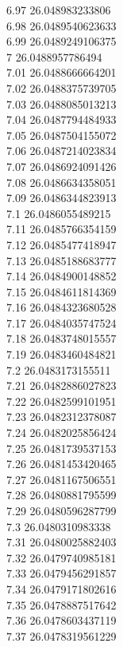 {6.97	26.048983233806\\
6.98	26.0489540623633\\
6.99	26.0489249106375\\
7	26.0488957786494\\
7.01	26.0488666664201\\
7.02	26.0488375739705\\
7.03	26.0488085013213\\
7.04	26.0487794484933\\
7.05	26.0487504155072\\
7.06	26.0487214023834\\
7.07	26.0486924091426\\
7.08	26.0486634358051\\
7.09	26.0486344823913\\
7.1	26.0486055489215\\
7.11	26.0485766354159\\
7.12	26.0485477418947\\
7.13	26.0485188683777\\
7.14	26.0484900148852\\
7.15	26.0484611814369\\
7.16	26.0484323680528\\
7.17	26.0484035747524\\
7.18	26.0483748015557\\
7.19	26.0483460484821\\
7.2	26.0483173155511\\
7.21	26.0482886027823\\
7.22	26.0482599101951\\
7.23	26.0482312378087\\
7.24	26.0482025856424\\
7.25	26.0481739537153\\
7.26	26.0481453420465\\
7.27	26.0481167506551\\
7.28	26.0480881795599\\
7.29	26.0480596287799\\
7.3	26.0480310983338\\
7.31	26.0480025882403\\
7.32	26.0479740985181\\
7.33	26.0479456291857\\
7.34	26.0479171802616\\
7.35	26.0478887517642\\
7.36	26.0478603437119\\
7.37	26.0478319561229\\
}
